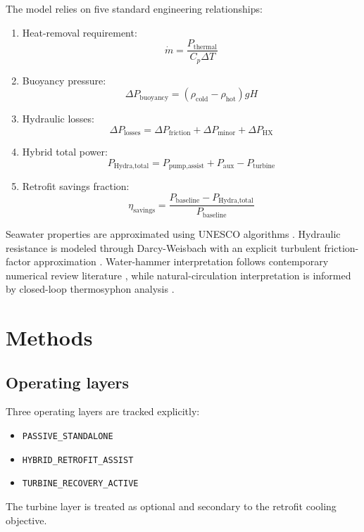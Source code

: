 \documentclass[11pt]{article}
\begin{document}
The model relies on five standard engineering relationships:

\begin{enumerate}[label=\arabic*)]
  \item Heat-removal requirement:
  \[
  \dot{m} = \frac{P_{\text{thermal}}}{C_p \Delta T}
  \]
  \item Buoyancy pressure:
  \[
  \Delta P_{\text{buoyancy}} = (\rho_{\text{cold}} - \rho_{\text{hot}}) g H
  \]
  \item Hydraulic losses:
  \[
  \Delta P_{\text{losses}} = \Delta P_{\text{friction}} + \Delta P_{\text{minor}} + \Delta P_{\text{HX}}
  \]
  \item Hybrid total power:
  \[
  P_{\text{Hydra,total}} = P_{\text{pump,assist}} + P_{\text{aux}} - P_{\text{turbine}}
  \]
  \item Retrofit savings fraction:
  \[
  \eta_{\text{savings}} = \frac{P_{\text{baseline}} - P_{\text{Hydra,total}}}{P_{\text{baseline}}}
  \]
\end{enumerate}

Seawater properties are approximated using UNESCO algorithms \citep{fofonoff1983}. Hydraulic resistance is modeled through Darcy-Weisbach with an explicit turbulent friction-factor approximation \citep{swamee1976}. Water-hammer interpretation follows contemporary numerical review literature \citep{pal2021}, while natural-circulation interpretation is informed by closed-loop thermosyphon analysis \citep{swart2020,zhang2018}.

\section{Methods}

\subsection{Operating layers}

Three operating layers are tracked explicitly:

\begin{itemize}
  \item \texttt{PASSIVE\_STANDALONE}
  \item \texttt{HYBRID\_RETROFIT\_ASSIST}
  \item \texttt{TURBINE\_RECOVERY\_ACTIVE}
\end{itemize}

The turbine layer is treated as optional and secondary to the retrofit cooling objective.
\end{document}
